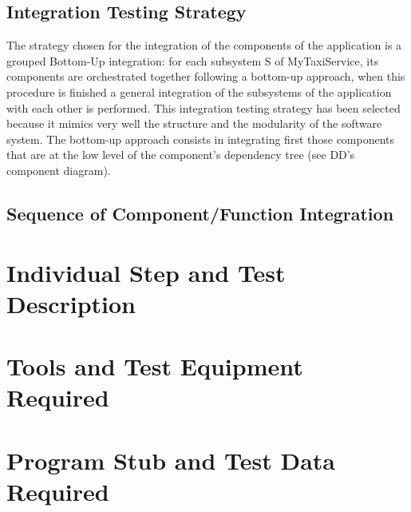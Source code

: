 \documentclass[11pt,titlepage]{article} %
\begin{document}
\subsection{Integration Testing Strategy}
  The strategy chosen for the integration of the components of the application is a grouped Bottom-Up integration: 
  for each subsystem S of MyTaxiService, its components are orchestrated together following a bottom-up approach, 
  when this procedure is finished a general integration of the subsystems of the application with each other is performed.\newline
  This integration testing strategy has been selected because it mimics very well the structure and the modularity of the software system.
  The bottom-up approach consists in integrating first those components that are at the low level of the component's dependency tree
  (see DD's component diagram).
  
\subsection{Sequence of Component/Function Integration} 


\section{Individual Step and Test Description}

\section{Tools and Test Equipment Required}

\section{Program Stub and Test Data Required}
\end{document}

